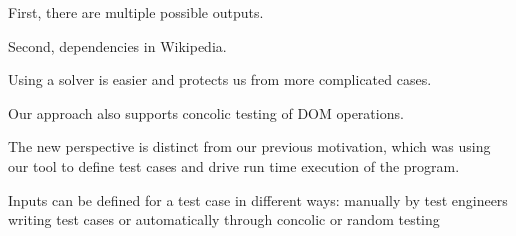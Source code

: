 First, there are multiple possible outputs.  

Second, dependencies in Wikipedia.  

Using a solver is easier and protects us from more complicated cases.

Our approach also supports concolic testing of DOM operations.



The new perspective is distinct from our previous motivation, which was using our tool to define test cases and drive run time execution of the program.  

Inputs can be defined for a test case in different ways: manually by test engineers writing test cases or automatically through concolic or random testing


